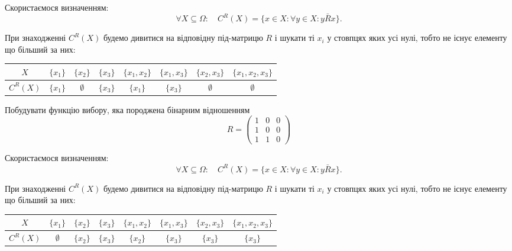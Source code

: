 \begin{solution}
    Скористаємося визначенням: \[ \forall X \subseteq \Omega: \quad C^R(X) = \{ x \in X: \forall y \in X: y \bar R x \}.\]
    
    При знаходженні $C^R(X)$ будемо дивитися на відповідну під-матрицю $R$ і шукати ті $x_i$ у стовпцях яких усі нулі, тобто не існує елементу що більший за них:
    
    \begin{table}[H]
        \centering
        \begin{tabular}{|c|c|c|c|c|c|c|c|}
            \hline
            $X$ & $\{x_1\}$ & $\{x_2\}$ & $\{x_3\}$ & $\{x_1, x_2\}$ & $\{x_1, x_3\}$ & $\{x_2, x_3\}$ & $\{x_1, x_2, x_3\}$ \\ \hline
                $C^R(X)$ & $\{x_1\}$ & $\emptyset$ & $\{x_3\}$ & $\{x_1\}$ & $\{x_3\}$ & $\emptyset$ & $\emptyset$ \\ \hline
        \end{tabular}
    \end{table}
\end{solution}

\begin{problem}
    Побудувати функцію вибору, яка породжена бінарним відношенням \[ R = \begin{pmatrix} 1 & 0 & 0 \\ 1 & 0 & 0 \\ 1 & 1 & 0 \end{pmatrix} \]
\end{problem}

\begin{solution}
    Скористаємося визначенням: \[ \forall X \subseteq \Omega: \quad C^R(X) = \{ x \in X: \forall y \in X: y \bar R x \}.\]

    При знаходженні $C^R(X)$ будемо дивитися на відповідну під-матрицю $R$ і шукати ті $x_i$ у стовпцях яких усі нулі, тобто не існує елементу що більший за них:
    \begin{table}[H]
        \centering
        \begin{tabular}{|c|c|c|c|c|c|c|c|}
            \hline
            $X$ & $\{x_1\}$ & $\{x_2\}$ & $\{x_3\}$ & $\{x_1, x_2\}$ & $\{x_1, x_3\}$ & $\{x_2, x_3\}$ & $\{x_1, x_2, x_3\}$ \\ \hline
            $C^R(X)$ & $\emptyset$ & $\{x_2\}$ & $\{x_3\}$ & $\{x_2\}$ & $\{x_3\}$ & $\{x_3\}$ & $\{x_3\}$ \\ \hline
        \end{tabular}
    \end{table}
\end{solution}

